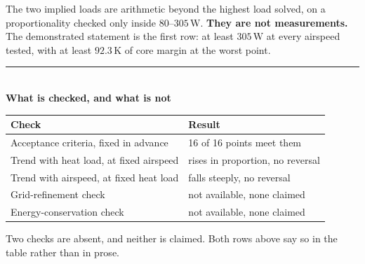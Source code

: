 \documentclass[9pt,a4paper]{article}
\renewcommand{\footnotesize}{\fontsize{6.9}{7.9}\selectfont}
\begin{document}
\begin{minipage}[t]{0.485\textwidth}
\vspace{1.5pt}
{\footnotesize The two implied loads are arithmetic beyond the highest load
solved, on a proportionality checked only inside $80$--$305\,\mathrm{W}$.
\textbf{They are not measurements.} The demonstrated
statement is the first row: at least $305\,\mathrm{W}$ at every airspeed tested,
with at least $92.3\,\mathrm{K}$ of core margin at the worst point.}
\end{minipage}

\vspace{1.5pt}
{\color{rulegrey}\rule{\textwidth}{0.5pt}}\\[1pt]
\textbf{What is checked, and what is not}

\vspace{1pt}
\begin{minipage}[t]{0.60\textwidth}
\vspace{0pt}
{\fontsize{7.2}{8.5}\selectfont
\begin{tabular}{l l}
\toprule
\textbf{Check} & \textbf{Result} \\
\midrule
Acceptance criteria, fixed in advance & 16 of 16 points meet them \\
Trend with heat load, at fixed airspeed & rises in proportion, no reversal \\
Trend with airspeed, at fixed heat load & falls steeply, no reversal \\
Grid-refinement check & not available, none claimed \\
Energy-conservation check & not available, none claimed \\
\bottomrule
\end{tabular}}

\vspace{1.5pt}
{\footnotesize Two checks are absent, and neither is claimed. Both rows above
say so in the table rather than in prose.}
\end{minipage}\hfill
\end{document}
